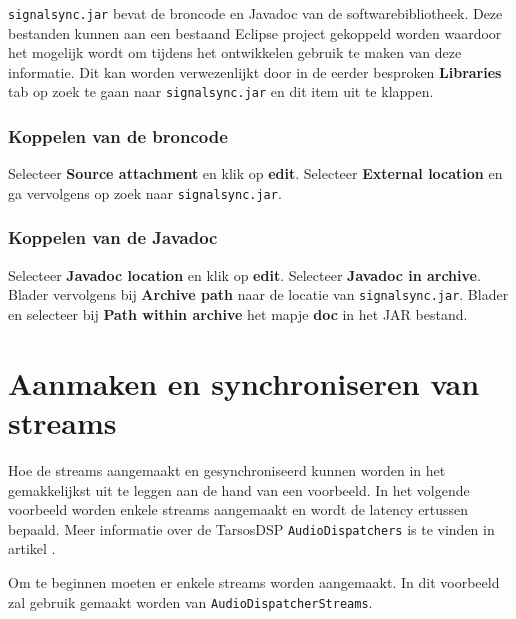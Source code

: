 \texttt{signalsync.jar} bevat de broncode en Javadoc van de softwarebibliotheek. Deze bestanden kunnen aan een bestaand Eclipse project gekoppeld worden waardoor het mogelijk wordt om tijdens het ontwikkelen gebruik te maken van deze informatie. Dit kan worden verwezenlijkt door in de eerder besproken \textbf{Libraries} tab op zoek te gaan naar \texttt{signalsync.jar} en dit item uit te klappen. 

\subsubsection{Koppelen van de broncode}

Selecteer \textbf{Source attachment} en klik op \textbf{edit}. Selecteer \textbf{External location} en ga vervolgens op zoek naar \texttt{signalsync.jar}.

\subsubsection{Koppelen van de Javadoc}

Selecteer \textbf{Javadoc location} en klik op \textbf{edit}. Selecteer \textbf{Javadoc in archive}. Blader vervolgens bij \textbf{Archive path} naar de locatie van \texttt{signalsync.jar}. Blader en selecteer bij \textbf{Path within archive} het mapje \textbf{doc} in het JAR bestand.

\section*{Aanmaken en synchroniseren van streams}

Hoe de streams aangemaakt en gesynchroniseerd kunnen worden in het gemakkelijkst uit te leggen aan de hand van een voorbeeld. In het volgende voorbeeld worden enkele streams aangemaakt en wordt de latency ertussen bepaald. Meer informatie over de TarsosDSP \texttt{AudioDispatchers} is te vinden in artikel \cite{six2014tarsosdsp}.

Om te beginnen moeten er enkele streams worden aangemaakt. In dit voorbeeld zal gebruik gemaakt worden van \texttt{AudioDispatcherStreams}. \\

\lstset{basicstyle=\footnotesize,style=javaStyle}

